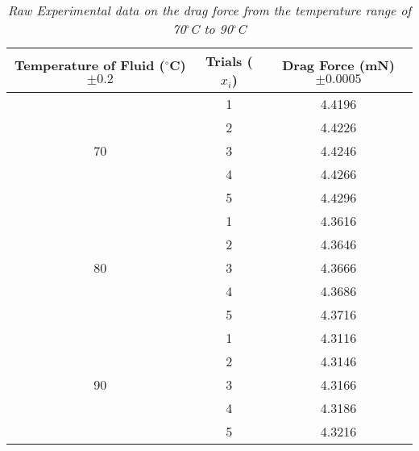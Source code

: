 \begin{table}[htbp]
  \centering
  \caption{\textit{Raw Experimental data on the drag force from the temperature range of 70$^\circ$C to 90$^\circ$C}}
    \begin{tabular}{ccc}
    \toprule
    Temperature of Fluid ($^\circ$C) $\pm 0.2$ & Trials ($x_i$) & Drag Force (mN) $\pm 0.0005$ \\
    \midrule
    \multirow{5}[10]{*}{70} & 1     & 4.4196 \\
\cmidrule{2-3}          & 2     & 4.4226 \\
\cmidrule{2-3}          & 3     & 4.4246 \\
\cmidrule{2-3}          & 4     & 4.4266 \\
\cmidrule{2-3}          & 5     & 4.4296 \\
    \midrule
    \multirow{5}[10]{*}{80} & 1     & 4.3616 \\
\cmidrule{2-3}          & 2     & 4.3646 \\
\cmidrule{2-3}          & 3     & 4.3666 \\
\cmidrule{2-3}          & 4     & 4.3686 \\
\cmidrule{2-3}          & 5     & 4.3716 \\
    \midrule
    \multirow{5}[10]{*}{90} & 1     & 4.3116 \\
\cmidrule{2-3}          & 2     & 4.3146 \\
\cmidrule{2-3}          & 3     & 4.3166 \\
\cmidrule{2-3}          & 4     & 4.3186 \\
\cmidrule{2-3}          & 5     & 4.3216 \\
    \bottomrule
    \end{tabular}%
  \label{tab:addlabel}%
\end{table}%




